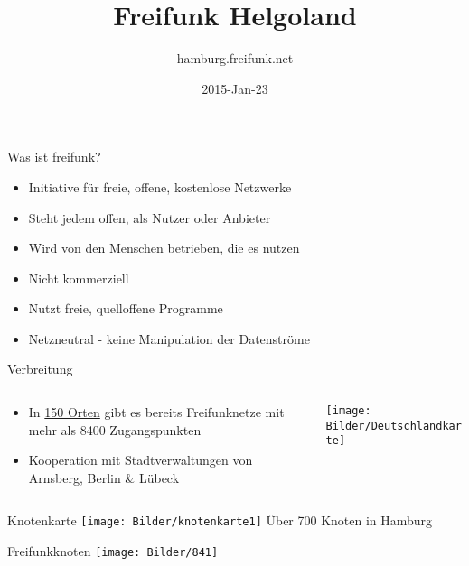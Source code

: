 \documentclass[t]{beamer}
\title{Freifunk Helgoland}
\author{hamburg.freifunk.net}
\date{2015-Jan-23}
\begin{document}
\maketitle

\begin{frame}{Was ist freifunk?}
	\begin{itemize}
		\item Initiative für freie, offene, kostenlose Netzwerke
		\item Steht jedem offen, als Nutzer oder Anbieter
		\item Wird von den Menschen betrieben, die es nutzen
		\item Nicht kommerziell
		\item Nutzt freie, quelloffene Programme
		\item Netzneutral - keine Manipulation der Datenströme		
	\end{itemize}
\end{frame}


\begin{frame}{Verbreitung}
	\begin{columns}
		\begin{column}{0.6\textwidth}
			\begin{itemize}
				\item In  \href{http://freifunk.net/wie-mache-ich-mit/community-finden/}{150 Orten} gibt es bereits Freifunknetze mit mehr als 8400 Zugangspunkten
				\item Kooperation mit Stadtverwaltungen von Arnsberg, Berlin \& Lübeck
			\end{itemize}
		\end{column}
		\begin{column}{0.4\textwidth}
			\begin{center}
				\texttt{[image: Bilder/Deutschlandkarte]}
			\end{center}
		\end{column}
	\end{columns}
\end{frame}


\begin{frame}{Knotenkarte}
	\texttt{[image: Bilder/knotenkarte1]}
	\newline Über 700 Knoten in Hamburg
\end{frame}


\begin{frame}{Freifunkknoten}
	\texttt{[image: Bilder/841]}
\end{frame}
\end{document}
